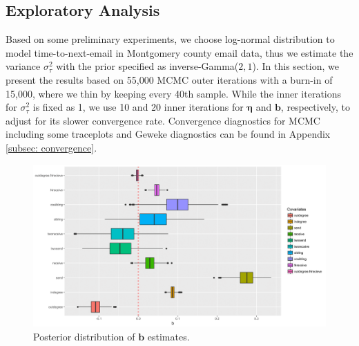 \documentclass[ba]{imsart}
\numberwithin{equation}{section}
\theoremstyle{plain}
\begin{document}
	\subsection{Exploratory Analysis}\label{subsec:Result_email}
	Based on some preliminary experiments, we choose log-normal distribution to model time-to-next-email in Montgomery county email data, thus we estimate the variance $\sigma_\tau^2$ with the prior specified as inverse-Gamma($2, 1$). In this section, we present the results based on 55,000 MCMC outer iterations with a burn-in of 15,000, where we thin by keeping every 40th sample. While the inner iterations for  $\sigma_\tau^2$ is fixed as 1, we use 10 and 20 inner iterations for $\boldsymbol{\eta}$ and $\boldsymbol{b}$, respectively, to adjust for its slower convergence rate. Convergence diagnostics for MCMC including some traceplots and Geweke diagnostics \citep{geweke1991evaluating} can be found in Appendix \ref{subsec: convergence}.
	\begin{figure}[!t]
		\centering
		\includegraphics[width=1\textwidth]{img/best-1.png}	
		\caption {Posterior distribution of $\boldsymbol{b}$ estimates.}
		\label{figure:betaresults}
	\end{figure}
	
\end{document}
